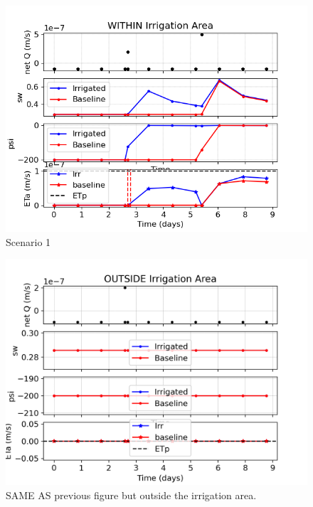 \documentclass{article}
\begin{document}
\begin{figure}[!htbp]
\centering
\includegraphics[width=0.875\linewidth]{files/plot_1d_evol_irrArea-219b9fec1dd755590a4d1ac1bb8279bb.png}
\caption*{Scenario 1}
\end{figure}

\begin{figure}[!htbp]
\centering
\includegraphics[width=0.875\linewidth]{files/plot_1d_evol_outArea-4651edee791016dd422d335828ba2785.png}
\caption*{SAME AS previous figure but outside the irrigation area.}
\end{figure}
\end{document}
